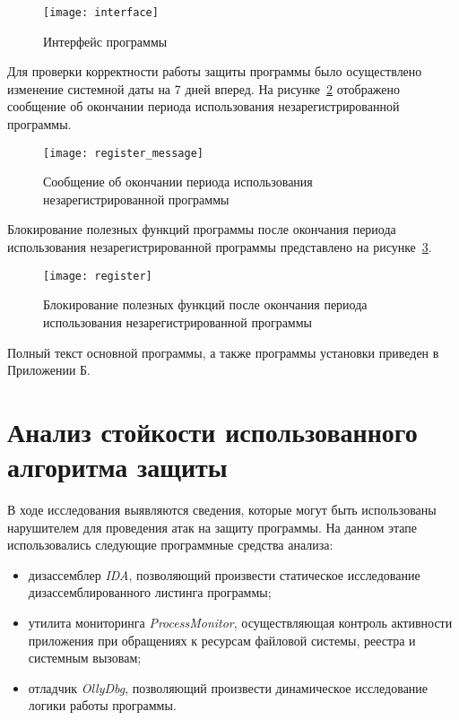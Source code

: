 \begin{figure}[h!]
  \centering
  \texttt{[image: interface]}
  \caption{Интерфейс программы}
  \label{fig:1}
\end{figure}

Для проверки корректности работы защиты программы было осуществлено
изменение системной даты на 7 дней вперед. На рисунке~\ref{fig:2}
отображено сообщение об окончании периода использования
незарегистрированной программы.

\begin{figure}[h!]
  \centering
  \texttt{[image: register\_message]}
  \caption{Сообщение об окончании периода использования
    незарегистрированной программы}
  \label{fig:2}
\end{figure}

Блокирование полезных функций программы после окончания периода
использования незарегистрированной программы представлено на
рисунке~\ref{fig:3}.

\begin{figure}[h!]
  \centering
  \texttt{[image: register]}
  \caption{Блокирование полезных функций после окончания периода
    использования незарегистрированной программы}
  \label{fig:3}
\end{figure}

Полный текст основной программы, а также программы установки приведен
в Приложении Б.

\section{Анализ стойкости использованного алгоритма защиты}
\label{sec:--4}

В ходе исследования выявляются сведения, которые могут быть
использованы нарушителем для проведения атак на защиту программы. На
данном этапе использовались следующие программные средства
анализа\cite{4}:

\vspace{-5mm}
\begin{itemize}
\item дизассемблер \textit{IDA}, позволяющий произвести статическое
  исследование дизассемблированного листинга программы;
\item утилита мониторинга \textit{ProcessMonitor}, осуществляющая
  контроль активности приложения при обращениях к ресурсам файловой
  системы, реестра и системным вызовам;
\item отладчик \textit{OllyDbg}, позволяющий произвести динамическое
  исследование логики работы программы.
\end{itemize}

